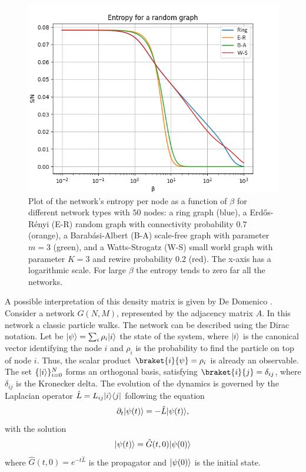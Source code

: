 \begin{figure}[ht!]
    \centering
    \includegraphics[width=0.80\linewidth]{image/random_graph.png}
    \caption{Plot of the network's entropy per node as a function of $\beta$ for different network types with $50$ nodes: a ring graph (blue), a Erd\H{o}s-Rényi (E-R) random graph with connectivity probability $0.7$ (orange), a Barab\'asi-Albert (B-A) scale-free graph with parameter $m=3$ (green), and a Watts-Strogatz (W-S) small world graph with parameter $K=3$ and rewire probability 0.2 (red). The x-axis has a logarithmic scale. For large $\beta$ the entropy tends to zero far all the networks.}
    \label{fig:ER-BA-WS}
\end{figure}



A possible interpretation of this density matrix is given by De Domenico \cite{De_Domenico_2020}.
Consider a network $G(N,M)$, represented by the adjacency matrix $A$. In this network a classic particle walks. 
The network can be described using the Dirac notation. Let be $\lvert\psi\rangle = \sum_i \rho_i \lvert i\rangle$ the state of the system, where $\lvert i\rangle$ is the canonical vector identifying the node $i$ and $\rho_i$ is the probability to find the particle on top of node $i$. Thus, the scalar product $\braket{i}{\psi} = \rho_i$ is already an observable. The set $\{\lvert i\rangle\}_{i=0}^N$ forms an orthogonal basis, satisfying $\braket{i}{j} = \delta_{ij}$, where $\delta_{ij}$ is the Kronecker delta. 
The evolution of the dynamics is governed by the Laplacian operator $\hat L = L_{ij} \lvert i\rangle\langle j\rvert$ following the equation
\begin{equation} \label{time_evolution}
    \partial_t \lvert\psi(t)\rangle = - \hat L \lvert\psi(t)\rangle,
\end{equation}
with the solution
\begin{equation}
    \lvert\psi(t)\rangle = \hat G(t,0) \lvert\psi(0)\rangle
\end{equation}
where $\hat G(t,0) = e^{-t\hat L}$ is the propagator and $\lvert\psi(0)\rangle$ is the initial state. 

